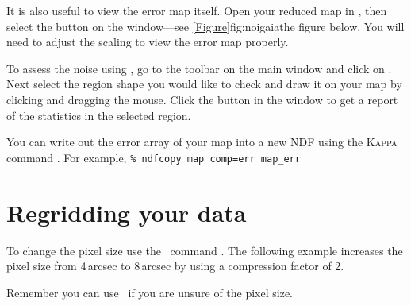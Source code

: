 It is also useful to view the error map itself. Open your reduced map
in \gaia, then select the  button on the
 window---see
\cref{Figure}{fig:noigaia}{the figure below}. You will need to adjust
the scaling to view the error map properly.

To assess the noise using \gaia, go to the toolbar on the main window
and click on . Next select the region shape you would like to check and
draw it on your map by clicking and dragging the mouse. Click the
 button in the 
window to get a report of the statistics in the selected region.

\begin{tip}
  You can write out the error array of your map into a new NDF using
  the \textsc{Kappa} command \ndfcopy. For example, \texttt{\% ndfcopy
    map comp=err map\_err}
\end{tip}





\section{Regridding your data}
\label{sec:regriddata}

To change the pixel size use the \Kappa\ command \compave. The
following example increases the pixel size from 4\,arcsec to 8\,arcsec
by using a compression factor of 2.

\begin{terminalv}
\end{terminalv}

\begin{tip}
  Remember you can use \ndftrace\ if you are unsure of the pixel size.
\end{tip}



